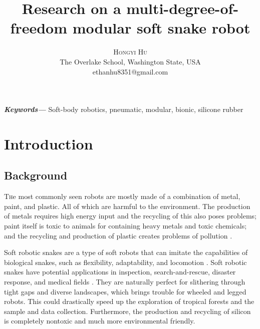 \documentclass[twoside, 11pt]{article}
\title{Research on a multi-degree-of-freedom modular soft snake robot}
\author{%
\textsc{Hongyi Hu}\\[1ex]
\normalsize The Overlake School, Washington State, USA \\ %
\normalsize ethanhu8351@gmail.com
}
\providecommand{\keywords}[1]
{
  \small	
  \textbf{\textit{Keywords---}} #1
}
\begin{document}
\maketitle
\keywords{Soft-body robotics, pneumatic, modular, bionic, silicone rubber}
\newpage
\tableofcontents
\newpage
\section{Introduction}
\subsection{Background}
\lettrine[nindent=0em,lines=3]{T} he most commonly seen robots are mostly made of a combination of metal, paint, and plastic. All of which are harmful to the environment. The production of metals requires high energy input and the recycling of this also poses problems; paint itself is toxic to animals for containing heavy metals and toxic chemicals; and the recycling and production of plastic creates problems of pollution \cite{porwal2015paint}. 

Soft robotic snakes are a type of soft robots that can imitate the capabilities of biological snakes, such as flexibility, adaptability, and locomotion \cite{bsf20}\cite{rt15}. Soft robotic snakes have potential applications in inspection, search-and-rescue, disaster response, and medical fields \cite{lwsstcgyo20}\cite{wsqsglfo}. They are naturally perfect for slithering through tight gaps and diverse landscapes, which brings trouble for wheeled and legged robots. This could drastically speed up the exploration of tropical forests and the sample and data collection. Furthermore, the production and recycling of silicon is completely nontoxic and much more environmental friendly. 
\end{document}
